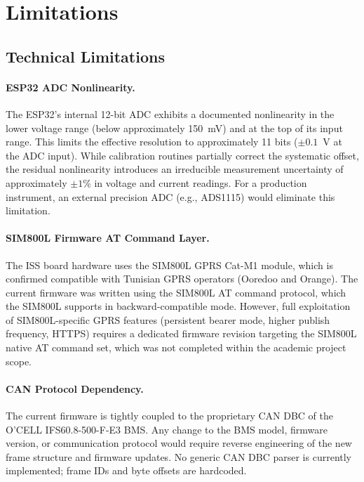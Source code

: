 \section{Limitations}

\subsection{Technical Limitations}

\paragraph{ESP32 ADC Nonlinearity.}
The ESP32's internal 12-bit ADC exhibits a documented nonlinearity in the lower voltage range (below approximately 150~mV) and at the top of its input range. This limits the effective resolution to approximately 11 bits ($\pm 0.1$~V at the ADC input). While calibration routines partially correct the systematic offset, the residual nonlinearity introduces an irreducible measurement uncertainty of approximately $\pm 1$\% in voltage and current readings. For a production instrument, an external precision ADC (e.g., ADS1115) would eliminate this limitation.

\paragraph{SIM800L Firmware AT Command Layer.}
The ISS board hardware uses the SIM800L GPRS Cat-M1 module, which is confirmed compatible with Tunisian GPRS operators (Ooredoo and Orange). The current firmware was written using the SIM800L AT command protocol, which the SIM800L supports in backward-compatible mode. However, full exploitation of SIM800L-specific GPRS features (persistent bearer mode, higher publish frequency, HTTPS) requires a dedicated firmware revision targeting the SIM800L native AT command set, which was not completed within the academic project scope.

\paragraph{CAN Protocol Dependency.}
The current firmware is tightly coupled to the proprietary CAN DBC of the O'CELL IFS60.8-500-F-E3 BMS. Any change to the BMS model, firmware version, or communication protocol would require reverse engineering of the new frame structure and firmware updates. No generic CAN DBC parser is currently implemented; frame IDs and byte offsets are hardcoded.

